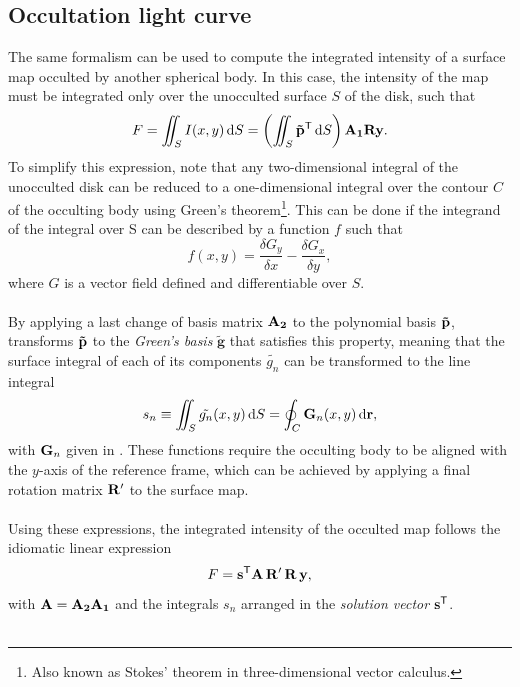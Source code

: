 \documentclass[modern]{aastex631}
\begin{document}
\subsection{Occultation light curve}\label{occultation}
The same formalism can be used to compute the integrated intensity of a surface map occulted by another spherical body. In this case, the intensity of the map must be integrated only over the unocculted surface $S$ of the disk, such that 
\begin{equation} F = \iint_S I(x,y)\,\text{d}S = \left(\iint_S \bvec{\tilde p^\mathsf{T}}\,\text{d}S\right)\bvec{A_1}\bvec{R}\bvec{y}.\end{equation}
To simplify this expression, \citealt{pal2012} note that any two-dimensional integral of the unocculted disk can be reduced to a one-dimensional integral over the contour $C$ of the occulting body using Green's theorem\footnote{Also known as Stokes' theorem in three-dimensional vector calculus.}. This can be done if the integrand of the integral over S can be described by a function $f$ such that
\begin{equation}f(x, y) = \frac{\delta G_{y}}{\delta x}-\frac{\delta G_{x}}{\delta y},\end{equation}
where $G$ is a vector field defined and differentiable over $S$.\\\\
By applying a last change of basis matrix ${\mathbf{A_2}}$ to the polynomial basis ${\mathbf{\tilde p}}$, \citealt{starry} transforms ${\mathbf{\tilde p}}$ to the \textit{Green's basis} $\bm{\tilde g}$ that satisfies this property, meaning that the surface integral of each of its components $\tilde{g_n}$ can be transformed to the line integral
\begin{equation}
    \label{eq:sn_gn}
    s_n \equiv \iint_S \tilde{g_n}(x, y)\,\text{d}S = \oint_C \bvec{G}_n(x, y)\,\text{d}\bvec{r},
\end{equation}
with ${\mathbf{G}}_n$ given in \citealt[Equation 34]{starry}. These functions require the occulting body to be aligned with the $y$-axis of the reference frame, which can be achieved by applying a final rotation matrix ${\mathbf{R'}}$ to the surface map.\\\\
Using these expressions, the integrated intensity of the occulted map follows the idiomatic linear expression 
\begin{equation}F = \bvec{s^\mathsf{T}}\bvec{A}\,\bvec{R'}\,\bvec{R}\,\bvec{y},\end{equation}
with ${\mathbf{A}} = {\mathbf{A_2A_1}}$ and the integrals $s_n$ arranged in the \textit{solution vector} ${\mathbf{s^\mathsf{T}}}$.\\\\
\end{document}
